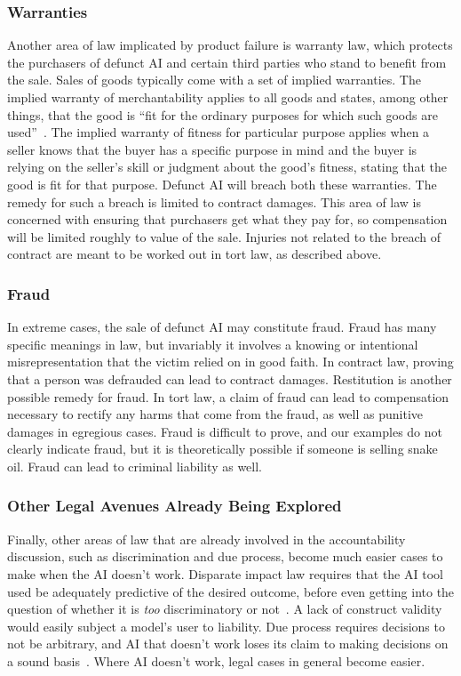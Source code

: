 \documentclass[acmconf,manuscript,screen,natbib=true]{acmart}
\begin{document}
\subsubsection{Warranties}

Another area of law implicated by product failure is warranty law, which protects the purchasers of defunct AI and certain third parties who stand to benefit from the sale. Sales of goods typically come with a set of implied warranties. The implied warranty of merchantability applies to all goods and states, among other things, that the good is ``fit for the ordinary purposes for which such goods are used''~\cite{UCC_2-314}. The implied warranty of fitness for particular purpose applies when a seller knows that the buyer has a specific purpose in mind and the buyer is relying on the seller's skill or judgment about the good's fitness, stating that the good is fit for that purpose\cite{UCC_2-315}. Defunct AI will breach both these warranties. 
The remedy for such a breach is limited to contract damages. This area of law is concerned with ensuring that purchasers get what they pay for, so compensation will be limited roughly to value of the sale. Injuries not related to the breach of contract are meant to be worked out in tort law, as described above.

\subsubsection{Fraud}

In extreme cases, the sale of defunct AI may constitute fraud. Fraud has many specific meanings in law, but invariably it involves a knowing or intentional misrepresentation that the victim relied on in good faith. In contract law, proving that a person was defrauded can lead to contract damages. Restitution is another possible remedy for fraud. In tort law, a claim of fraud can lead to compensation necessary to rectify any harms that come from the fraud, as well as punitive damages in egregious cases. Fraud is difficult to prove, and our examples do not clearly indicate fraud, but it is theoretically possible if someone is selling snake oil. Fraud can lead to criminal liability as well.

\subsubsection{Other Legal Avenues Already Being Explored}

Finally, other areas of law that are already involved in the accountability discussion, such as discrimination and due process, become much easier cases to make when the AI doesn't work. Disparate impact law requires that the AI tool used be adequately predictive of the desired outcome, before even getting into the question of whether it is \textit{too} discriminatory or not~\cite{barocas2016big}. A lack of construct validity would easily subject a model's user to liability. Due process requires decisions to not be arbitrary, and AI that doesn't work loses its claim to making decisions on a sound basis~\cite{citron2007technological}. Where AI doesn't work, legal cases in general become easier.
\end{document}
